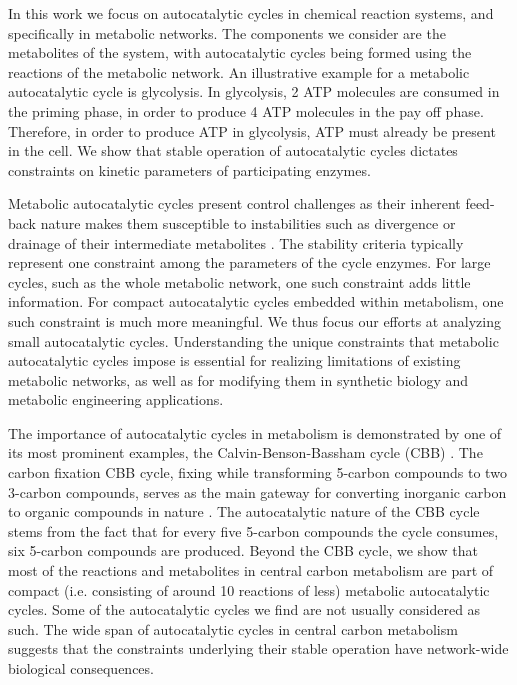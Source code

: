    In this work we focus on autocatalytic cycles in chemical reaction systems, and specifically in metabolic networks.
    The components we consider are the metabolites of the system, with autocatalytic cycles being formed using the reactions of the metabolic network.
    An illustrative example for a metabolic autocatalytic cycle is glycolysis.
    In glycolysis, 2 ATP molecules are consumed in the priming phase, in order to produce 4 ATP molecules in the pay off phase.
    Therefore, in order to produce ATP in glycolysis, ATP must already be present in the cell.
    We show that stable operation of autocatalytic cycles dictates constraints on kinetic parameters of participating enzymes.

    Metabolic autocatalytic cycles present control challenges as their inherent feed-back nature makes them susceptible to instabilities such as divergence or drainage of their intermediate metabolites \cite{Fell1999,Reznik2010-te}.
    The stability criteria typically represent one constraint among the parameters of the cycle enzymes.
    For large cycles, such as the whole metabolic network, one such constraint adds little information.
    For compact autocatalytic cycles embedded within metabolism, one such constraint is much more meaningful.
    We thus focus our efforts at analyzing small autocatalytic cycles.
    Understanding the unique constraints that metabolic autocatalytic cycles impose is essential for realizing limitations of existing metabolic networks, as well as for modifying them in synthetic biology and metabolic engineering applications.

    The importance of autocatalytic cycles in metabolism is demonstrated by one of its most prominent examples, the Calvin-Benson-Bassham cycle (CBB) \cite{Benson1950-cl}.
    The carbon fixation CBB cycle, fixing  while transforming 5-carbon compounds to two 3-carbon compounds, serves as the main gateway for converting inorganic carbon to organic compounds in nature \cite{Raven2012-le}.
    The autocatalytic nature of the CBB cycle stems from the fact that for every five 5-carbon compounds the cycle consumes, six 5-carbon compounds are produced.
    Beyond the CBB cycle, we show that most of the reactions and metabolites in central carbon metabolism are part of compact (i.e. consisting of around 10 reactions of less) metabolic autocatalytic cycles.
    Some of the autocatalytic cycles we find are not usually considered as such.
    The wide span of autocatalytic cycles in central carbon metabolism suggests that the constraints underlying their stable operation have network-wide biological consequences.

